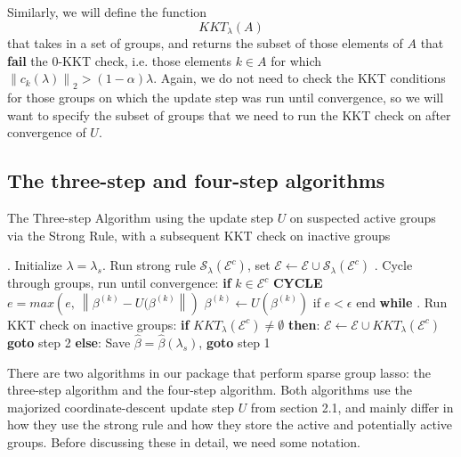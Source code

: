 \documentclass[12pt]{article}
\newcommand{\norm}[1]{\left\lVert #1 \right\rVert}
\begin{document}
Similarly, we will define the function 
\[
KKT_{\lambda}(A)
\]
that takes in a  set of groups, and returns the subset of those elements of $A$ that \textbf{fail} the 0-KKT check, i.e. those elements $k \in A$ for which $\norm{c_k(\lambda)}_2 > (1-\alpha)\lambda$. Again, we do not need to check the KKT conditions for those groups on which the update step was run until convergence, so we will want to specify the subset of groups that we need to run the KKT check on after convergence of $U$.

\subsection{The three-step and four-step algorithms}




\begin{algorithm}[tb!]
  \caption{The Three-step Algorithm using the update step $U$ on suspected active groups via the Strong Rule, with a subsequent KKT check on inactive groups} 
  \label{alg:threeStep}
  \begin{algorithmic}
	. Initialize $\lambda = \lambda_s$. Run strong rule $\mathcal{S}_{\lambda}(\mathcal{E}^c)$, set $\mathcal{E} \leftarrow \mathcal{E}\cup\mathcal{S}_{\lambda}(\mathcal{E}^c)$    
    . Cycle through groups, run until convergence:
	\STATE \textbf{if} $k \in \mathcal{E}^c$ \textbf{CYCLE}
	\STATE $e = max(e,\ \norm{\beta^{(k)} - U(\beta^{(k)}})$
	\STATE	$\beta^{(k)} \leftarrow U(\beta^{(k)})$
	\ENDFOR
	\STATE if $e < \epsilon$ end \textbf{while}
	\ENDWHILE
	. Run KKT check on inactive groups:
	\STATE \textbf{if} $KKT_{\lambda}(\mathcal{E}^c) \neq \emptyset$ \textbf{then}:
	\STATE $\mathcal{E} \leftarrow \mathcal{E}\cup KKT_{\lambda}(\mathcal{E}^c)$
	\STATE \textbf{goto} step 2
	\STATE \textbf{else}:
	\STATE Save $\hat{\beta} = \hat{\beta}(\lambda_s)$, \textbf{goto} step 1
  \end{algorithmic}
\end{algorithm}



There are two algorithms in our package that perform sparse group lasso: the three-step algorithm and the four-step algorithm. Both algorithms use the majorized coordinate-descent update step $U$ from section 2.1, and mainly differ in how they use the strong rule and how they store the active and potentially active groups. Before discussing these in detail, we need some notation.
\end{document}

